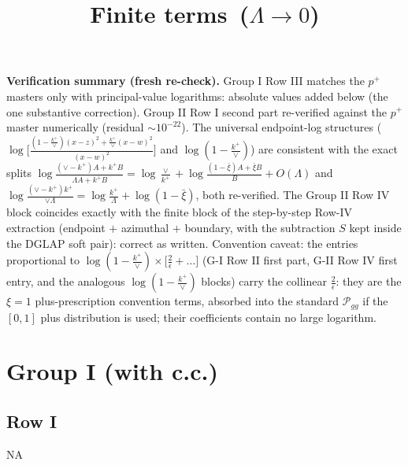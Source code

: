 \documentclass[9pt]{article}
\title{Finite terms\, ($\Lambda\to 0$)}
\author{}
\date{}
\numberwithin{equation}{section}
\begin{document}
\maketitle
{\color{red}\noindent\textbf{Verification summary (fresh re-check).} Group I Row III matches
the $p^{+}$ masters only with principal-value logarithms: absolute values added below (the one
substantive correction). Group II Row I second part re-verified against the $p^{+}$ master
numerically (residual $\sim10^{-22}$). The universal endpoint-log structures
($\log\big[\frac{(1-\frac{k^{+}}{\vee})(x-z)^{2}+\frac{k^{+}}{\vee}(x-w)^{2}}{(x-w)^{2}}\big]$
and $\log(1-\frac{k^{+}}{\vee})$) are consistent with the exact splits
$\log\frac{(\vee-k^{+})A+k^{+}B}{\Lambda A+k^{+}B}=\log\frac{\vee}{k^{+}}
+\log\frac{(1-\bar\xi)A+\bar\xi B}{B}+O(\Lambda)$ and
$\log\frac{(\vee-k^{+})k^{+}}{\vee\Lambda}=\log\frac{k^{+}}{\Lambda}+\log(1-\bar\xi)$, both
re-verified. The Group II Row IV block coincides exactly with the finite block of the
step-by-step Row-IV extraction (endpoint $+$ azimuthal $+$ boundary, with the subtraction $S$
kept inside the DGLAP soft pair): correct as written. Convention caveat: the entries
proportional to $\log(1-\frac{k^{+}}{\vee})\times\big[\frac{2}{\epsilon}+\dots\big]$ (G-I Row
II first part, G-II Row IV first entry, and the analogous $\log(1-\frac{k^{+}}{\vee})$ blocks)
carry the collinear $\frac{2}{\epsilon}$: they are the $\xi=1$ plus-prescription convention
terms, absorbed into the standard $\mathcal P_{gg}$ if the $[0,1]$ plus distribution is used;
their coefficients contain no large logarithm.}
\section{Group I (with c.c.)}
\subsection{Row I}
\textsc{NA}
\end{document}

